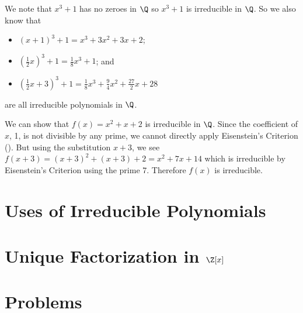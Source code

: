 \begin{example}
    We note that $x^3 + 1$ has no zeroes in $\Q$ so $x^3 + 1$ is irreducible in $\Q$. So we also know that
    \begin{itemize}
        \item $(x+1)^3 + 1 = x^3 + 3x^2 + 3x + 2$;
        \item $(\frac12x)^3 + 1 = \frac18x^3 + 1$; and
        \item $(\frac12x + 3)^3 + 1 = \frac18x^3 + \frac94x^2 + \frac{27}2x + 28$
    \end{itemize}
    are all irreducible polynomials in $\Q$.
\end{example}

\begin{example}
    We can show that $f(x) = x^2 + x + 2$ is irreducible in $\Q$. Since the coefficient of $x$, 1, is not divisible by any prime, we cannot directly apply Eisenstein's Criterion (). But using the substitution $x + 3$, we see $f(x+3) = (x+3)^2 + (x+3) + 2 = x^2 + 7x + 14$ which is irreducible by Eisenstein's Criterion using the prime 7. Therefore $f(x)$ is irreducible.
\end{example}

\section{Uses of Irreducible Polynomials}

\section{Unique Factorization in $\Z[x]$}

\newpage

\section{Problems}

